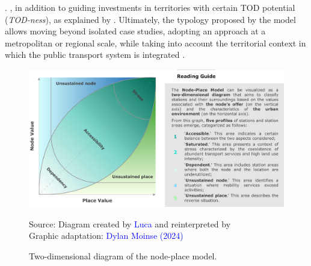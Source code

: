 \begin{refsegment}
{     \textcolor{blue}{\autocite[41]{lyu_developing_2016}}.
} \textcolor{blue}{\autocite[41]{lyu_developing_2016}}, in addition to guiding investments in territories with certain \acrshort{TOD} potential (\textsl{TOD-ness}), as explained by \textcolor{blue}{\textcite[242]{ibrahim_measuring_2023}}. Ultimately, the typology proposed by the model allows moving beyond isolated case studies, adopting an approach at a metropolitan or regional scale, while taking into account the territorial context in which the public transport system is integrated \textcolor{blue}{\autocite[113]{ibraeva_transit-oriented_2020}}.%

    \begin{figure}[h!]\vspace*{4pt}
        \caption{Two-dimensional diagram of the node-place model.}
        \label{fig-chap6:schema-theorique-NP}
        \centerline{\includegraphics[width=1\columnwidth]{src/Figures/Chap-6/EN_NPART_Diagramme_Bertolini.pdf}}
        \vspace{5pt}
        \begin{flushright}\scriptsize{
        Source: Diagram created by \textcolor{blue}{Luca} \textcolor{blue}{\textcite[202]{bertolini_spatial_1999}} and reinterpreted by \textcolor{blue}{\textcite[243]{yang_tod_2021}}
        \\
        Graphic adaptation: \textcolor{blue}{Dylan Moinse (2024)}
        }\end{flushright}
    \end{figure}


\end{refsegment}
